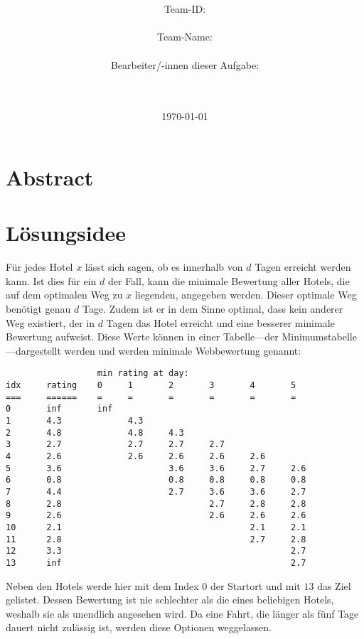 \documentclass[a4paper,10pt,ngerman]{scrartcl}
\title{\textbf{\Huge\Aufgabe}}
\author{\LARGE Team-ID: \LARGE \TeamId \\\\
	    \LARGE Team-Name: \LARGE \TeamName \\\\
	    \LARGE Bearbeiter/-innen dieser Aufgabe: \\ 
	    \LARGE \Namen\\\\}
\date{\LARGE\today}
\begin{document}
\maketitle
\tableofcontents

\vspace{0.5cm}

\section{Abstract}

\section{Lösungsidee}
Für jedes Hotel $x$ lässt sich sagen, ob es innerhalb von $d$ Tagen erreicht werden kann.
Ist dies für ein $d$ der Fall, kann die minimale Bewertung aller Hotels, die auf dem optimalen Weg zu $x$ liegenden, angegeben werden.
Dieser optimale Weg benötigt genau $d$ Tage.
Zudem ist er in dem Sinne optimal, dass kein anderer Weg existiert, der in $d$ Tagen das Hotel erreicht und eine besserer minimale Bewertung aufweist.
Diese Werte können in einer Tabelle---der Minimumstabelle---dargestellt werden und werden minimale Webbewertung genannt:
\begin{lstlisting}
                  min rating at day:
idx     rating    0     1       2       3       4       5
===     ======    =     =       =       =       =       =
0       inf       inf
1       4.3             4.3
2       4.8             4.8     4.3
3       2.7             2.7     2.7     2.7
4       2.6             2.6     2.6     2.6     2.6
5       3.6                     3.6     3.6     2.7     2.6
6       0.8                     0.8     0.8     0.8     0.8
7       4.4                     2.7     3.6     3.6     2.7
8       2.8                             2.7     2.8     2.8
9       2.6                             2.6     2.6     2.6
10      2.1                                     2.1     2.1
11      2.8                                     2.7     2.8
12      3.3                                             2.7
13      inf                                             2.7
\end{lstlisting}
Neben den Hotels werde hier mit dem Index $0$ der Startort und mit $13$ das Ziel gelistet.
Dessen Bewertung ist nie schlechter als die eines beliebigen Hotels, weshalb sie als unendlich angesehen wird.
Da eine Fahrt, die länger als fünf Tage dauert nicht zulässig ist, werden diese Optionen weggelassen.
\end{document}
